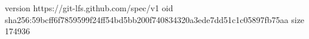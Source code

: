 version https://git-lfs.github.com/spec/v1
oid sha256:59bcff6f7859599f24ff54bd5bb200f740834320a3ede7dd51c1c05897fb75aa
size 174936
